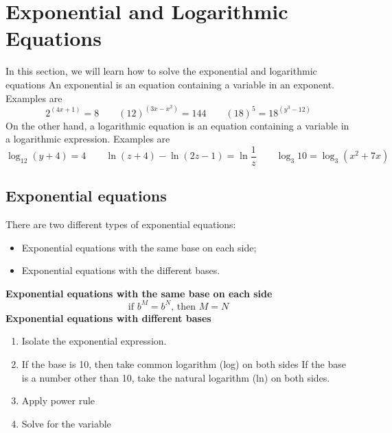 \chapter{Exponential and Logarithmic Equations}
In this section, we will learn how to solve the exponential and logarithmic equations
An exponential is an equation containing a variable in an exponent. Examples are 
\[
	2^{(4x+1)}=8	\qquad		(12)^{(3x-x^2)}=144	 \qquad	(18)^5=18^{(y^3-12)}
\]
On the other hand, a logarithmic equation is an equation containing a variable in a 
logarithmic expression. Examples are
\[
	\log_{12}(y+4)=4	\qquad		\ln{(z+4)}-\ln{(2z-1)}=\ln{\frac{1}{z}}	 \qquad
	\log_{3}10=\log_{3}(x^2+7x)
\]
\section{Exponential equations}
There are two different types of exponential equations:
\begin{itemize}
 \item Exponential equations with the same base on each side;
 \item Exponential equations with the different bases.
\end{itemize}
\begin{tcolorbox}[title=Exponential equations, 
                  fonttitle=\bfseries,
                  colframe=green!70!black,
                  colback=green!60!white]
 \textbf{Exponential equations with the same base on each side}
	\[
	\text{if  } b^M=b^N \text{, then } M=N	
	\]
 \textbf{Exponential equations with different bases}
 	\begin{enumerate}
 		\item Isolate the exponential expression.
 		\item If the base is 10, then take common logarithm (log) on both sides
			  If the base is a number other than 10, take the natural logarithm (ln) on 
			  both sides.
		\item Apply power rule
		\item Solve for the variable
 	\end{enumerate}
\end{tcolorbox}
